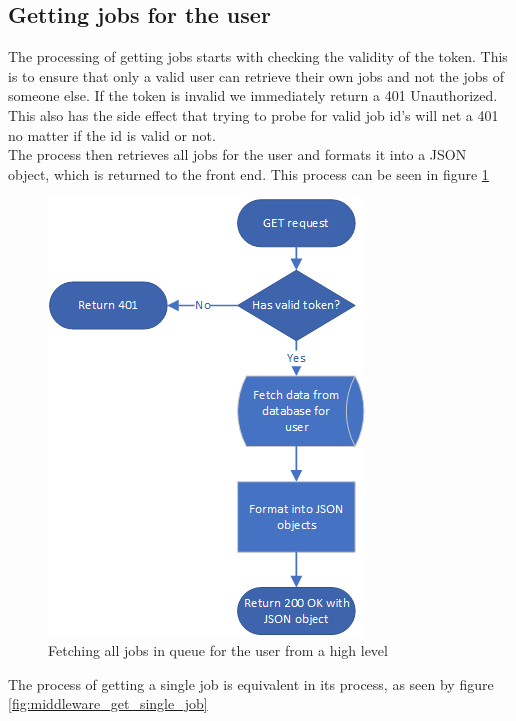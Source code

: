 \documentclass[../main.tex]{subfiles}
\begin{document}
\subsection*{Getting jobs for the user}
The processing of getting jobs starts with checking the validity of the token. This is to ensure that only a valid user can retrieve their own jobs and not the jobs of someone else. If the token is invalid we immediately return a 401 Unauthorized. This also has the side effect that trying to probe for valid job id's will net a 401 no matter if the id is valid or not.\\
The process then retrieves all jobs for the user and formats it into a JSON object, which is returned to the front end. This process can be seen in figure \ref{fig:middleware_get_jobs}
\begin{figure}[H]
    \centering
    \includegraphics{img/middleware_get_jobs.png}
    \caption{Fetching all jobs in queue for the user from a high level}
    \label{fig:middleware_get_jobs}
\end{figure}
The process of getting a single job is equivalent in its process, as seen by figure \ref{fig:middleware_get_single_job}
\end{document}
